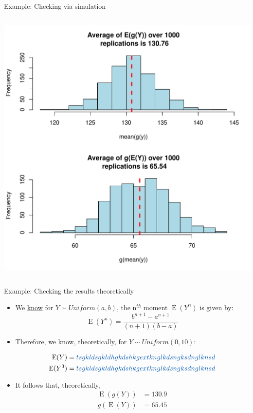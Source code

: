 \documentclass[10pt,handout]{beamer}\usepackage[]{graphicx}\usepackage[]{color}
\makeatletter
\def\maxwidth{ %
  \ifdim\Gin@nat@width>\linewidth
    \linewidth
  \else
    \Gin@nat@width
  \fi
}
\newenvironment{knitrout}{}{} %
\newcommand{\Expec}{\operatorname{E}}
\makeatother
\begin{document}
\begin{frame}[fragile]{Example: Checking via simulation}
\begin{columns}
\begin{column}{0.5\textwidth}
\begin{knitrout}
{\centering \includegraphics[width=\maxwidth]{figure/unnamed-chunk-5-1} 

}


\end{knitrout}
\end{column}
\end{columns}
\end{frame}


\begin{frame}[fragile]{Example: Checking the results theoretically}
	\begin{itemize}
		\item We \href{https://en.wikipedia.org/wiki/Continuous_uniform_distribution#Moments}{know} for $Y \sim Uniform(a, b)$, the n$^{th}$ moment $\Expec(Y^n)$ is given by:
		$$
		\Expec(Y^n) = \frac{b^{n+1} - a^{n+1}}{(n+1)(b-a)}
		$$
		\pause
		\item Therefore, we know, theoretically, for $Y \sim Uniform(0, 10)$: 
		
		\begin{align}
		\Expec(Y) &= \textcolor{white}{tsgkldsgkldhgkdshkgextknglkdsngksdnglknsd} \\
		\Expec(Y^3) &= \textcolor{white}{tsgkldsgkldhgkdshkgextknglkdsngksdnglknsd}
		\end{align}
		\pause		
		\item It follows that, theoretically, 
		\begin{align}
			\Expec(g(Y)) & = 130.9\\
			g(\Expec(Y)) & = 65.45
		\end{align}
	\end{itemize}
\end{frame}
\end{document}

